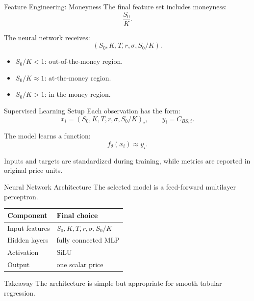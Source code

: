 \documentclass[10pt,aspectratio=43]{beamer}
\newcommand{\takeaway}[1]{%
    \begin{block}{Takeaway}
        #1
    \end{block}
}
\begin{document}
\begin{frame}{Feature Engineering: Moneyness}
    The final feature set includes moneyness:
    \[
        \frac{S_0}{K}.
    \]

    The neural network receives:
    \[
        (S_0,K,T,r,\sigma,S_0/K).
    \]

    \begin{itemize}
        \item \(S_0/K<1\): out-of-the-money region.
        \item \(S_0/K\approx 1\): at-the-money region.
        \item \(S_0/K>1\): in-the-money region.
    \end{itemize}
\end{frame}

\begin{frame}{Supervised Learning Setup}
    Each observation has the form:
    \[
        x_i=(S_0,K,T,r,\sigma,S_0/K)_i,
        \qquad
        y_i=C_{BS,i}.
    \]

    The model learns a function:
    \[
        f_\theta(x_i)\approx y_i.
    \]

    Inputs and targets are standardized during training, while metrics are reported in original price units.
\end{frame}

\begin{frame}{Neural Network Architecture}
    The selected model is a feed-forward multilayer perceptron.

    \begin{center}
        \small
        \begin{tabular}{ll}
            \toprule
            Component      & Final choice               \\
            \midrule
            Input features & \(S_0,K,T,r,\sigma,S_0/K\) \\
            Hidden layers  & fully connected MLP        \\
            Activation     & SiLU                       \\
            Output         & one scalar price           \\
            \bottomrule
        \end{tabular}
    \end{center}

    \takeaway{The architecture is simple but appropriate for smooth tabular regression.}
\end{frame}
\end{document}
